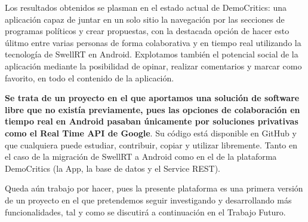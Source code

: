 Los resultados obtenidos se plasman en el estado actual de DemoCritics: una aplicación capaz de juntar en un solo sitio la navegación por las secciones de programas políticos y crear propuestas, con la destacada opción de hacer esto úlitmo entre varias personas de forma colaborativa y en tiempo real utilizando la tecnología de SwellRT en Android. Explotamos también el potencial social de la aplicación mediante la posibilidad de opinar, realizar comentarios y marcar como favorito, en todo el contenido de la aplicación.

\textbf{Se trata de un proyecto en el que aportamos una solución de software libre  que no existía previamente, pues las opciones de colaboración en tiempo real en Android pasaban únicamente por soluciones privativas como el Real Time API de Google}. Su código está disponible en GitHub y que cualquiera puede estudiar, contribuir, copiar y utilizar libremente. Tanto en el caso de la migración de SwellRT a Android como en el de la plataforma DemoCritics (la App, la base de datos y el Service REST). 

Queda aún trabajo por hacer, pues la presente plataforma es una primera versión de un proyecto en el que pretendemos seguir investigando y desarrollando más funcionalidades, tal y como se discutirá a continuación en el Trabajo Futuro. 